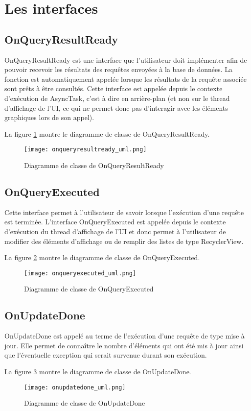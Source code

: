 \section{Les interfaces}

\subsection{OnQueryResultReady}

OnQueryResultReady est une interface que l'utilisateur doit implémenter afin de pouvoir recevoir les résultats des requêtes envoyées à la base de données. La fonction est automatiquement appelée lorsque les résultats de la requête associée sont prêts à être consultés. Cette interface est appelée depuis le contexte d'exécution de AsyncTask, c'est à dire en arrière-plan (et non sur le thread d'affichage de l'UI, ce qui ne permet donc pas d'interagir avec les éléments graphiques lors de son appel).

La figure \ref{fig:onqueryresultready_uml} montre le diagramme de classe de OnQueryResultReady.

\begin{figure}[htb]
\centering 
\texttt{[image: onqueryresultready\_uml.png]} 
\caption{Diagramme de classe de OnQueryResultReady}
\label{fig:onqueryresultready_uml}
 \end{figure}

\subsection{OnQueryExecuted}

Cette interface permet à l'utilisateur de savoir lorsque l'exécution d'une requête est terminée. L'interface OnQueryExecuted est appelée depuis le contexte d'exécution du thread d'affichage de l'UI et donc permet à l'utilisateur de modifier des éléments d'affichage ou de remplir des listes de type RecyclerView.

La figure \ref{fig:onqueryexecuted_uml} montre le diagramme de classe de OnQueryExecuted.

\begin{figure}[htb]
\centering 
\texttt{[image: onqueryexecuted\_uml.png]} 
\caption{Diagramme de classe de OnQueryExecuted}
\label{fig:onqueryexecuted_uml}
 \end{figure}

\subsection{OnUpdateDone}

OnUpdateDone est appelé au terme de l'exécution d'une requête de type mise à jour. Elle permet de connaître le nombre d'éléments qui ont été mis à jour ainsi que l'éventuelle exception qui serait survenue durant son exécution.

La figure \ref{fig:onupdatedone_uml} montre le diagramme de classe de OnUpdateDone.

\begin{figure}[htb]
\centering 
\texttt{[image: onupdatedone\_uml.png]} 
\caption{Diagramme de classe de OnUpdateDone}
\label{fig:onupdatedone_uml}
 \end{figure}
